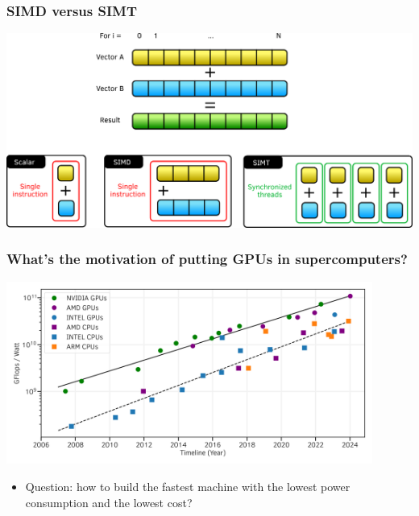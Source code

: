 \documentclass[aspectratio=169]{beamer}
\begin{document}
\begin{frame}
    \frametitle{SIMD versus SIMT}

    \begin{center}
        \includegraphics[width=\textwidth]{../../images/SIMD_vs_SIMT.png}
    \end{center}

\end{frame}


\begin{frame}
    \frametitle{What's the motivation of putting GPUs in supercomputers?}

\begin{center}
    \includegraphics[width=0.9\textwidth]{../../images/flop_watt_ratio_history_fp64.png}
\end{center}

\begin{itemize}
    \item Question: how to build the fastest machine with the lowest power consumption and the lowest cost?
\end{itemize}

\end{frame}

\end{document}
